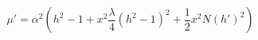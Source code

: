 \begin{equation}
\label{mu}
\mu' = \alpha^2  \left( h^2-1 + x^2\frac{\lambda}{4}(h^2-1)^2 +\frac{1}{2}
x^2N (h')^2 \right) 
\end{equation}

